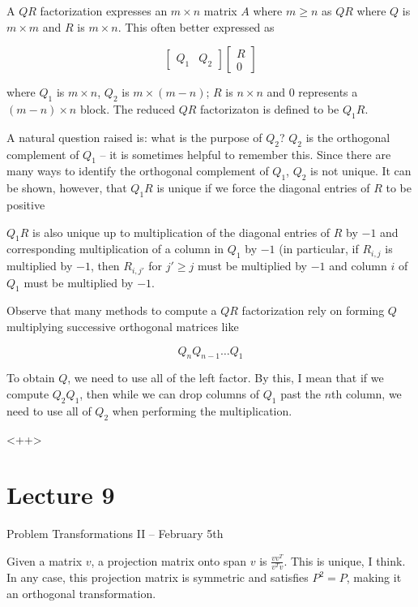 \documentclass[../main.tex]{subfiles}
\begin{document}
\begin{definition}
    A $QR$ factorization expresses an $m \times n$ matrix $A$ where $m \geq n$ as $QR$ where $Q$ is $m \times m$ and $R$ is $m \times n$. This often better expressed as 

    \[
        \begin{bmatrix}
            Q_1 & Q_2
        \end{bmatrix} \begin{bmatrix}
            R \\
            0
        \end{bmatrix}
    \]

    where $Q_1$ is $m \times n$, $Q_2$ is $m \times (m-n)$; $R$ is $n \times n$ and $0$ represents a $(m-n) \times n$ block. The reduced $QR$ factorizaton is defined to be $Q_1 R$.
\end{definition}

\begin{remark}
    A natural question raised is: what is the purpose of $Q_2$? $Q_2$ is the orthogonal complement of $Q_1$ -- it is sometimes helpful to remember this. Since there are many ways to identify the orthogonal complement of $Q_1$, $Q_2$ is not unique. It can be shown, however, that $Q_1R$ is unique if we force the diagonal entries of $R$ to be positive

    $Q_1R$ is also unique up to multiplication of the diagonal entries of $R$ by $-1$ and corresponding multiplication of a column in $Q_1$ by $-1$ (in particular, if $R_{i,j}$ is multiplied by $-1$, then $R_{i,j'}$ for $j' \geq j$ must be multiplied by $-1$ and column $i$ of $Q_1$ must be multiplied by $-1$.
\end{remark}

\begin{remark}
    Observe that many methods to compute a $QR$ factorization rely on forming $Q$ multiplying successive orthogonal matrices like


    \[
        Q_n Q_{n-1} \dots Q_{1}
    \]

    To obtain $Q$, we need to use all of the left factor. By this, I mean that if we compute $Q_2 Q_1$, then while we can drop columns of $Q_1$ past the $n$th column, we need to use all of $Q_2$ when performing the multiplication.
\end{remark}<++>
\section{Lecture 9}{Problem Transformations II -- February 5th}
\begin{definition}
    Given a matrix $v$, a projection matrix onto span $v$ is $\frac{vv^T}{v^Tv}.$ This is unique, I think. In any case, this projection matrix is symmetric and satisfies $P^2 = P$, making it an orthogonal transformation.
\end{definition}
\end{document}
